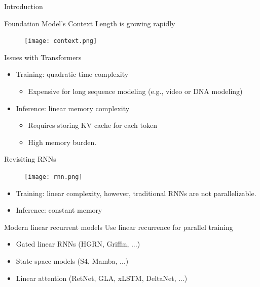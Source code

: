 
\frame{\titlepage}
\begin{frame}{}
    \centering
    \LARGE
    Introduction
    \end{frame}

\begin{frame}{Foundation Model's Context Length is growing rapidly}
    \begin{figure}
        \centering
        \texttt{[image: context.png]}
    \end{figure}
\end{frame}

\begin{frame}{Issues with Transformers}

    \begin{itemize}
        \item Training: quadratic time complexity 
        \begin{itemize}
            \item Expensive for long sequence modeling (e.g., video or DNA modeling)
         \end{itemize}
        \item Inference: linear memory complexity
        \begin{itemize}
            \item Requires storing KV cache for each token
            \item High memory burden.
        \end{itemize}
    \end{itemize}    

\end{frame}

\begin{frame}{Revisiting RNNs}
    \begin{figure}
        \centering
        \texttt{[image: rnn.png]}
    \end{figure}
    \begin{itemize}
            \item Training: linear complexity, however, traditional RNNs are not parallelizable.
            \vspace{2mm}
            \item Inference: constant memory
    \end{itemize}
\end{frame}


\begin{frame}{Modern linear recurrent models}
    Use linear recurrence for parallel training
    \vspace{2mm}
    \begin{itemize}
        \item Gated linear RNNs (HGRN, Griffin, ...)
        \item State-space models (S4, Mamba, ...)
        \item Linear attention (RetNet, GLA, xLSTM, DeltaNet, ...)
    \end{itemize}

\end{frame}


